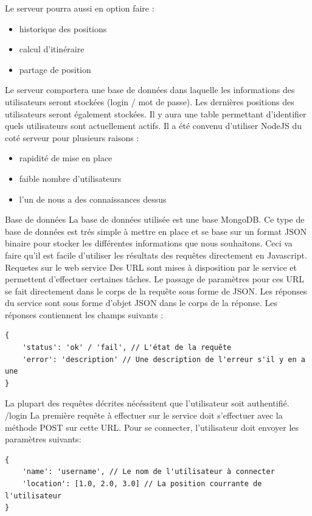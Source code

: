 Le serveur pourra aussi en option faire :
\begin{itemize}
    \item historique des positions
    \item calcul d'itinéraire
    \item partage de position
\end{itemize}

Le serveur comportera une base de données dans laquelle les informations des utilisateurs seront stockées (login / mot de passe). Les dernières positions des utilisateurs seront également stockées. Il y aura une table permettant d'identifier quels utilisateurs sont actuellement actifs.
Il a été convenu d'utiliser NodeJS du coté serveur pour plusieurs raisons :
\begin{itemize}
    \item rapidité de mise en place
    \item faible nombre d'utilisateurs
    \item l'un de nous a des connaissances dessus
\end{itemize}

Base de données
La base de données utilisée est une base MongoDB. Ce type de base de données est trés simple à mettre en place et se base sur un format JSON binaire pour stocker les différentes informations que nous souhaitons. Ceci va faire qu'il est facile d'utiliser les résultats des requêtes directement en Javascript.
Requetes sur le web service
Des URL sont mises à disposition par le service et permettent d'effectuer certaines tâches. Le passage de paramètres pour ces URL se fait directement dans le corps de la requête sous forme de JSON.
Les réponses du service sont sous forme d'objet JSON dans le corps de la réponse. Les réponses contiennent les champs suivants :

\lstset{language=Javascript}
\begin{lstlisting}[caption=Corps de la réponse serveur]
{
    'status': 'ok' / 'fail', // L'état de la requête
    'error': 'description' // Une description de l'erreur s'il y en a une
}
\end{lstlisting}


La plupart des requêtes décrites nécéssitent que l'utilisateur soit authentifié.
/login
La première requête à effectuer sur le service doit s'effectuer avec la méthode POST sur cette URL. Pour se connecter, l'utilisateur doit envoyer les paramètres suivants: 
\lstset{language=Javascript}
\begin{lstlisting}[caption=Corps de la requête login]
{
    'name': 'username', // Le nom de l'utilisateur à connecter
    'location': [1.0, 2.0, 3.0] // La position courrante de l'utilisateur
}
\end{lstlisting}

